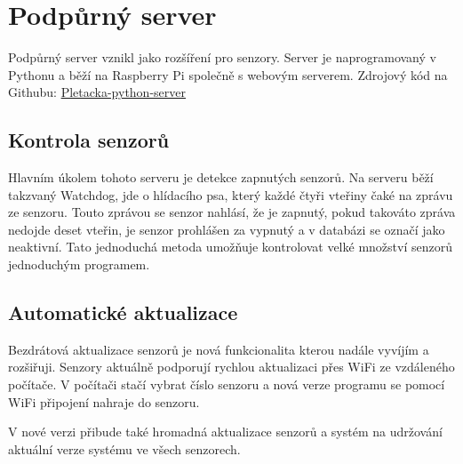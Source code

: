 \chapter{Podpůrný server}
Podpůrný server vznikl jako rozšíření pro senzory.
Server je naprogramovaný v Pythonu a běží na Raspberry Pi společně s webovým serverem.\newline
Zdrojový kód na Githubu: \href{https://github.com/Pletacka-IoT/Pletacka-python-server}{Pletacka-python-server}\cite{PL_PY}


\section{Kontrola senzorů}
Hlavním úkolem tohoto serveru je detekce zapnutých senzorů.
Na serveru běží takzvaný Watchdog, jde o hlídacího psa, který každé čtyři vteřiny čaké na zprávu ze senzoru.
Touto zprávou se senzor nahlásí, že je zapnutý, pokud takováto zpráva nedojde deset vteřin, je senzor prohlášen za vypnutý a v databázi se označí jako neaktivní.
Tato jednoduchá metoda umožňuje kontrolovat velké množství senzorů jednoduchým programem.

\section{Automatické aktualizace}
Bezdrátová aktualizace senzorů je nová funkcionalita kterou nadále vyvíjím a rozšiřuji.
Senzory aktuálně podporují rychlou aktualizaci přes WiFi ze vzdáleného počítače.
V počítači stačí vybrat číslo senzoru a nová verze programu se pomocí WiFi připojení nahraje do senzoru.

V nové verzi přibude také hromadná aktualizace senzorů a systém na udržování aktuální verze systému ve všech senzorech.




\newpage